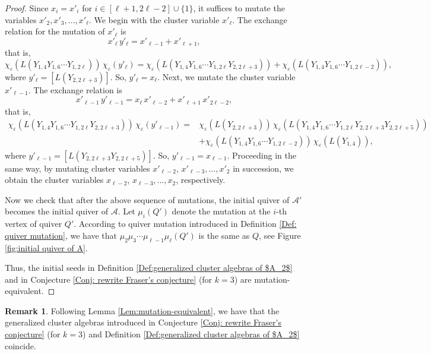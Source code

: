 \documentclass[11pt, reqno]{amsart}
\theoremstyle{plain}
\theoremstyle{definition}
\newtheorem{remark}[theorem]{Remark}
\numberwithin{equation}{section}
\begin{document}
\begin{proof}
Since $x_i=x'_i$ for $i\in[\ell+1, 2 \ell-2]\cup \{1\}$, it suffices to mutate the variables $x'_2,x'_3, \ldots, x'_\ell$. We begin with the cluster variable $x'_\ell$. The exchange relation for the mutation of $x'_\ell$ is 
\[
x'_\ell \,y'_\ell=x'_{\ell-1}+x'_{\ell+1},
\]
that is, 
\[
\chi_\varepsilon(L(Y_{1,4}Y_{1,6} \cdots Y_{1,2 \ell}))\,\chi_\varepsilon( y'_\ell)=\chi_\varepsilon(L(Y_{1,4}Y_{1,6}\cdots Y_{1,2 \ell}Y_{2,2 \ell+3}))+\chi_\varepsilon(L(Y_{1,4}Y_{1,6} \cdots Y_{1,2 \ell-2})),
\]
where $y'_\ell=[L(Y_{2,2 \ell+3})]$. So, $y'_\ell=x_\ell$. Next, we mutate the cluster variable $x'_{\ell-1}$. The exchange relation is
\[
x'_{\ell-1}\, y'_{\ell-1}=x_{\ell}\,x'_{\ell-2}+x'_{\ell+1}\,x'_{2 \ell-2},
\]
that is,
\begin{align*}
\chi_\varepsilon(L(Y_{1,4}Y_{1,6}\cdots Y_{1,2 \ell}Y_{2,2 \ell+3}))\, \chi_\varepsilon(y'_{\ell-1})=& \chi_\varepsilon(L(Y_{2,2 \ell+3}))\,\chi_\varepsilon(L(Y_{1,4}Y_{1,6}\cdots Y_{1,2 \ell}Y_{2,2 \ell+3}Y_{2,2 \ell+5}))\\
& +\chi_\varepsilon(L(Y_{1,4}Y_{1,6} \cdots Y_{1,2 \ell-2}))\,\chi_\varepsilon(L(Y_{1,4})),
\end{align*}
where $y'_{\ell-1}=[L(Y_{2,2 \ell+3}Y_{2,2 \ell+5})]$. So, $y'_{\ell-1}=x_{\ell-1}$. Proceeding in the same way, by mutating cluster variables $x'_{\ell-2}$, $x'_{\ell-3}, \ldots, x'_2$ in succession, we obtain the cluster variables $x_{\ell-2}$, $x_{\ell-3}, \ldots, x_2$, respectively. 

Now we check that after the above sequence of mutations, the initial quiver of $\mathcal{A}'$ becomes the initial quiver of $\mathcal{A}$. 
Let $\mu_i(Q')$ denote the mutation at the $i$-th vertex of quiver $Q'$. According to quiver mutation introduced in Definition \ref{Def: quiver mutation}, we have that $\mu_2\mu_3\cdots\mu_{\ell-1}\mu_{\ell}(Q')$ is the same as $Q$, see Figure \ref{fig:initial quiver of A}.

Thus, the initial seeds in Definition \ref{Def:generalized cluster algebras of $A_2$} and in Conjecture \ref{Conj: rewrite Fraser's conjecture} (for $k=3$) are mutation-equivalent.
\end{proof}

\begin{remark}
Following Lemma \ref{Lem:mutation-equivalent}, we have that the generalized cluster algebras introduced in Conjecture \ref{Conj: rewrite Fraser's conjecture} (for $k=3$) and Definition \ref{Def:generalized cluster algebras of $A_2$} coincide. 
\end{remark} 
\end{document}
